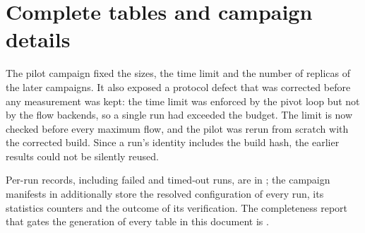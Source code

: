 \section{Complete tables and campaign details}
\label{sec:appendix}


The pilot campaign fixed the sizes, the time limit and the number of replicas of
the later campaigns. It also exposed a protocol defect that was corrected before
any measurement was kept: the time limit was enforced by the \FS{} pivot loop but
not by the flow backends, so a single run had exceeded the budget. The limit is
now checked before every maximum flow, and the pilot was rerun from scratch with
the corrected build. Since a run's identity includes the build hash, the earlier
results could not be silently reused.

Per-run records, including failed and timed-out runs, are in
; the campaign manifests in
 additionally store the resolved
configuration of every run, its statistics counters and the outcome of its
verification. The completeness report that gates the generation of every table
in this document is .
